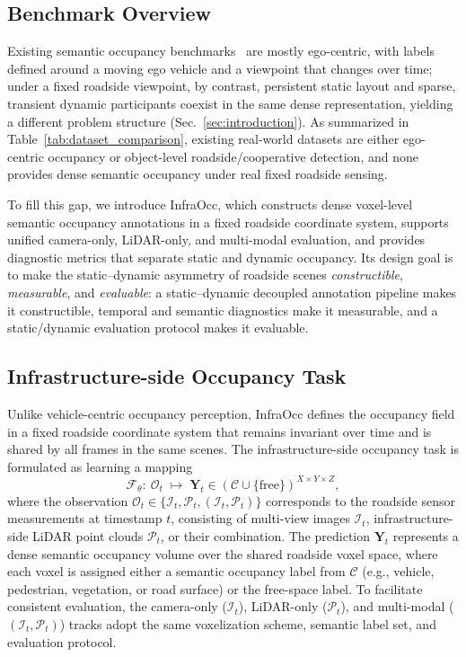\subsection{Benchmark Overview}
\label{sec:benchmark_overview}

Existing semantic occupancy benchmarks~\cite{OpenOccupancy,Occ3D} are mostly
ego-centric, with labels defined around a moving ego vehicle and a viewpoint that
changes over time; under a fixed roadside viewpoint, by contrast, persistent
static layout and sparse, transient dynamic participants coexist in the same
dense representation, yielding a different problem structure
(Sec.~\ref{sec:introduction}). As summarized in
Table~\ref{tab:dataset_comparison}, existing real-world datasets are either
ego-centric occupancy or object-level roadside/cooperative detection, and none
provides dense semantic occupancy under real fixed roadside sensing.

To fill this gap, we introduce InfraOcc, which constructs dense voxel-level
semantic occupancy annotations in a fixed roadside coordinate system, supports
unified camera-only, LiDAR-only, and multi-modal evaluation, and provides
diagnostic metrics that separate static and dynamic occupancy. Its design goal is
to make the static--dynamic asymmetry of roadside scenes \emph{constructible},
\emph{measurable}, and \emph{evaluable}: a static--dynamic decoupled annotation
pipeline makes it constructible, temporal and semantic diagnostics make it
measurable, and a static/dynamic evaluation protocol makes it evaluable.

\subsection{Infrastructure-side Occupancy Task}
\label{sec:benchmark_task}

Unlike vehicle-centric occupancy perception, InfraOcc defines the occupancy
field in a fixed roadside coordinate system that remains invariant over time and
is shared by all frames in the same scenes. The infrastructure-side occupancy task is
formulated as learning a mapping
\begin{equation}
  \mathcal{F}_{\theta}:\ \mathcal{O}_t \;\longmapsto\;
  \mathbf{Y}_t \in (\mathcal{C}\cup\{\mathrm{free}\})^{X\times Y\times Z},
\end{equation}
where the observation
$\mathcal{O}_t\in\{\mathcal{I}_t,\mathcal{P}_t,(\mathcal{I}_t,\mathcal{P}_t)\}$
corresponds to the roadside sensor measurements at timestamp $t$, consisting of
multi-view images $\mathcal{I}_t$, infrastructure-side LiDAR point clouds
$\mathcal{P}_t$, or their combination. The prediction
$\mathbf{Y}_t$ represents a dense semantic occupancy volume over the shared
roadside voxel space, where each voxel is assigned either a semantic occupancy
label from $\mathcal{C}$ (e.g., vehicle, pedestrian, vegetation, or road
surface) or the free-space label. To facilitate consistent evaluation, the
camera-only ($\mathcal{I}_t$), LiDAR-only ($\mathcal{P}_t$), and multi-modal
($(\mathcal{I}_t,\mathcal{P}_t)$) tracks adopt the same voxelization scheme,
semantic label set, and evaluation protocol.


